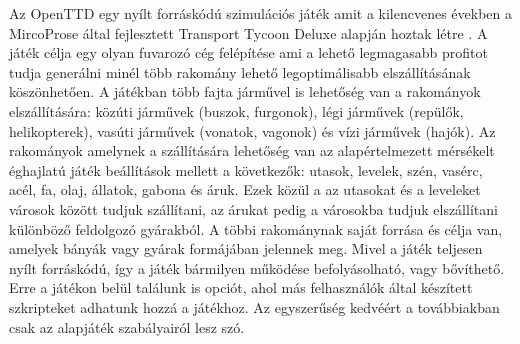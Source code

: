 

Az OpenTTD egy nyílt forráskódú szimulációs játék amit a kilencvenes években a MircoProse által fejlesztett Transport Tycoon Deluxe alapján hoztak létre \cite{openttd}. A játék célja egy olyan fuvarozó cég felépítése ami a lehető legmagasabb profitot tudja generálni minél több rakomány lehető legoptimálisabb elszállításának köszönhetően. A játékban több fajta járművel is lehetőség van a rakományok elszállítására: közúti járművek (buszok, furgonok), légi járművek (repülők, helikopterek), vasúti járművek (vonatok, vagonok) és vízi járművek (hajók). Az rakományok amelynek a szállítására lehetőség van az alapértelmezett mérsékelt éghajlatú játék beállítások mellett a következők: utasok, levelek, szén, vasérc, acél, fa, olaj, állatok, gabona és áruk. Ezek közül a az utasokat és a leveleket városok között tudjuk szállítani, az árukat pedig a városokba tudjuk elszállítani különböző feldolgozó gyárakból. A többi rakománynak saját forrása és célja van, amelyek bányák vagy gyárak formájában jelennek meg. Mivel a játék teljesen nyílt forráskódú, így a játék bármilyen működése befolyásolható, vagy bővíthető. Erre a játékon belül találunk is opciót, ahol más felhasználók által készített szkripteket adhatunk hozzá a játékhoz. Az egyszerűség kedvéért a továbbiakban csak az alapjáték szabályairól lesz szó.

